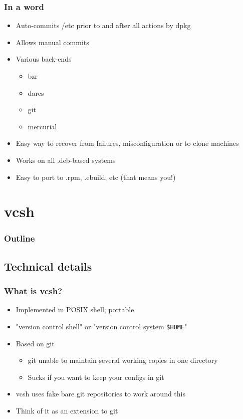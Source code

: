 \documentclass[t]{beamer}
\begin{document}
\begin{frame}
	\frametitle{In a word}
	\begin{itemize}
		\item Auto-commits /etc prior to and after all actions by dpkg
		\item Allows manual commits
		\item Various back-ends
		\begin{itemize}
			\item bzr
			\item darcs
			\item git
			\item mercurial
		\end{itemize}
		\item Easy way to recover from failures, misconfiguration or to clone machines
		\item Works on all .deb-based systems
		\item Easy to port to .rpm, .ebuild, etc (that means you!)
	\end{itemize}
\end{frame}



\section{vcsh}
\begin{frame}
	\frametitle{Outline}
	\tableofcontents[currentsection]
\end{frame}

\subsection{Technical details}

\begin{frame}
	\frametitle{What is vcsh?}
	\begin{itemize}
		\item Implemented in POSIX shell; portable
		\item "version control shell" or "version control system \texttt{\$HOME}"
		\item Based on git
		\begin{itemize}
			\item git unable to maintain several working copies in one directory
			\item Sucks if you want to keep your configs in git
		\end{itemize}
		\item vcsh uses fake bare git repositories to work around this
		\item Think of it as an extension to git
	\end{itemize}
\end{frame}
\end{document}
